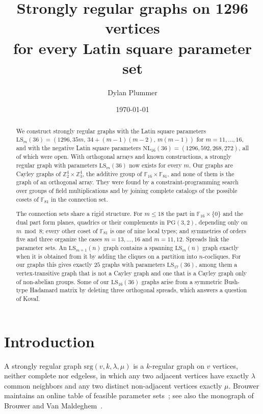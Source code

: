 \documentclass[11pt]{amsart}
\title[Latin square type graphs on 1296 vertices]{Strongly regular graphs on 1296 vertices\\ for every Latin square parameter set}
\author{Dylan Plummer}
\date{\today}
\theoremstyle{definition}
\newcommand{\F}{\mathbb{F}}
\newcommand{\Z}{\mathbb{Z}}
\newcommand{\srg}{\mathrm{srg}}
\newcommand{\LS}{\mathrm{LS}}
\newcommand{\NL}{\mathrm{NL}}
\begin{document}
\begin{abstract}
We construct strongly regular graphs with the Latin square parameters $\LS_m(36)=(1296,35m,\,34+(m-1)(m-2),\,m(m-1))$ for $m=11,\dots,16$, and with the negative Latin square parameters $\NL_{16}(36)=(1296,592,268,272)$, all of which were open. With orthogonal arrays and known constructions, a strongly regular graph with parameters $\LS_m(36)$ now exists for every $m$. Our graphs are Cayley graphs of $\Z_2^4\times\Z_3^4$, the additive group of $\F_{16}\times\F_{81}$, and none of them is the graph of an orthogonal array. They were found by a constraint-programming search over groups of field multiplications and by joining complete catalogs of the possible cosets of $\F_{81}$ in the connection set.

The connection sets share a rigid structure. For $m\le18$ the part in $\F_{16}\times\{0\}$ and the dual part form planes, quadrics or their complements in $\mathrm{PG}(3,2)$, depending only on $m\bmod 8$; every other coset of $\F_{81}$ is one of nine local types; and symmetries of orders five and three organize the cases $m=13,\dots,16$ and $m=11,12$. Spreads link the parameter sets. An $\LS_{m+1}(n)$ graph contains a spanning $\LS_m(n)$ graph exactly when it is obtained from it by adding the cliques on a partition into $n$-cocliques. For our graphs this gives exactly $25$ graphs with parameters $\LS_{17}(36)$, among them a vertex-transitive graph that is not a Cayley graph and one that is a Cayley graph only of non-abelian groups. Some of our $\LS_{16}(36)$ graphs arise from a symmetric Bush-type Hadamard matrix by deleting three orthogonal spreads, which answers a question of Kova\v{l}.
\end{abstract}

\maketitle

\section{Introduction}

A strongly regular graph $\srg(v,k,\lambda,\mu)$ is a $k$-regular graph on $v$ vertices, neither complete nor edgeless, in which any two adjacent vertices have exactly $\lambda$ common neighbors and any two distinct non-adjacent vertices exactly $\mu$. Brouwer maintains an online table of feasible parameter sets~\cite{BrouwerTable}; see also the monograph of Brouwer and Van Maldeghem~\cite{BvM2022}.
\end{document}
